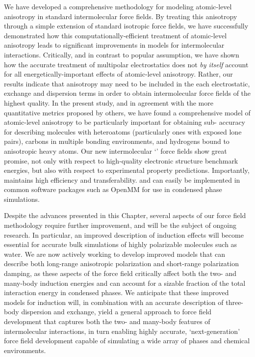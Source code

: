 We have developed a comprehensive methodology for modeling 
atomic-level anisotropy in standard intermolecular force fields. 
By treating this anisotropy through a simple extension of
standard isotropic force
fields,\cite{VanVleet2016}
we have 
successfully demonstrated how this computationally-efficient treatment of atomic-level anisotropy leads to
significant improvements in models for intermolecular interactions.
Critically, 
and in contrast to popular assumption, we have shown how the accurate treatment of multipolar electrostatics 
does not \emph{by itself} account for all energetically-important effects of
atomic-level anisotropy.
Rather, our results indicate that anisotropy may need to be included in the
each electrostatic, exchange and dispersion terms in order to obtain intermolecular
force fields of the highest quality.
In the present study,
and in agreement with the more quantitative metrics proposed by others,\cite{Wheatley2012,Kramer2014} 
we have found
a comprehensive model of atomic-level anisotropy to be particularly important for obtaining sub-\kjmolold
accuracy for describing molecules with heteroatoms
(particularly ones with exposed lone pairs), carbons in multiple
bonding environments, and hydrogens bound to anisotropic heavy atoms. 
Our new intermolecular `\mastiff' force fields show great promise, not only with
respect to high-quality electronic structure benchmark energies, but also with
respect to experimental property predictions.
Importantly, \mastiff maintains high efficiency and transferability.
and can easily be implemented in common software packages such as 
OpenMM for use in condensed phase simulations.\cite{Eastman2013} 

Despite the advances presented in this Chapter, several aspects of our force
field methodology require further improvement, and will be the subject of
ongoing research. In particular, an improved description of induction effects
will become essential for accurate bulk simulations of highly polarizable
molecules such as water.  We are now actively working to develop improved
models that can describe both long-range anisotropic polarization and
short-range polarization damping, as these aspects of the force field
critically affect both the two- and many-body induction energies and
can account for a sizable fraction of the total interaction energy in
condensed phases.
We anticipate that these improved models for induction will, in
combination with an accurate description of three-body dispersion and
exchange, yield a general approach to force field development that captures
both the two- and many-body features of intermolecular interactions, in turn
enabling highly accurate, `next-generation' force field development capable of
simulating a wide array of phases and chemical environments.

